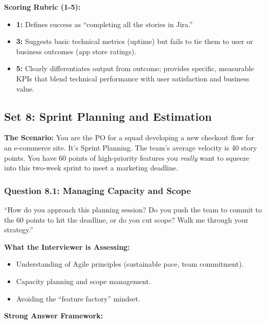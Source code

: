 \documentclass[
  11pt,
  openany,
  oneside]{book}
\providecommand{\tightlist}{%
  \setlength{\itemsep}{0pt}\setlength{\parskip}{0pt}}
\begin{document}
\textbf{Scoring Rubric (1-5):}

\begin{itemize}
\tightlist
\item
  \textbf{1:} Defines success as ``completing all the stories in Jira.''
\item
  \textbf{3:} Suggests basic technical metrics (uptime) but fails to tie
  them to user or business outcomes (app store ratings).
\item
  \textbf{5:} Clearly differentiates output from outcome; provides
  specific, measurable KPIs that blend technical performance with user
  satisfaction and business value.
\end{itemize}

\bigskip

\subsection{Set 8: Sprint Planning and
Estimation}\label{set-8-sprint-planning-and-estimation}

\textbf{The Scenario:} You are the PO for a squad developing a new
checkout flow for an e-commerce site. It's Sprint Planning. The team's
average velocity is 40 story points. You have 60 points of high-priority
features you \emph{really} want to squeeze into this two-week sprint to
meet a marketing deadline.

\subsubsection{Question 8.1: Managing Capacity and
Scope}\label{question-8.1-managing-capacity-and-scope}

``How do you approach this planning session? Do you push the team to
commit to the 60 points to hit the deadline, or do you cut scope? Walk
me through your strategy.''

\textbf{What the Interviewer is Assessing:}

\begin{itemize}
\tightlist
\item
  Understanding of Agile principles (sustainable pace, team commitment).
\item
  Capacity planning and scope management.
\item
  Avoiding the ``feature factory'' mindset.
\end{itemize}

\textbf{Strong Answer Framework:}
\end{document}
